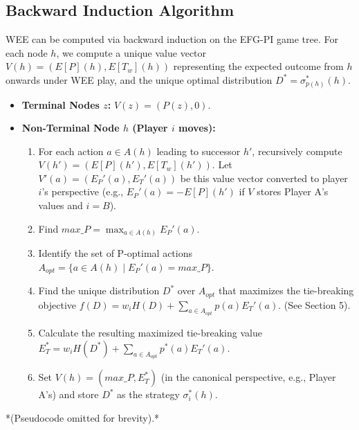 \documentclass{article}
\begin{document}
\subsection{Backward Induction Algorithm}
WEE can be computed via backward induction on the EFG-PI game tree. For each node $h$, we compute a unique value vector $V(h) = (E[P](h), E[T_w](h))$ representing the expected outcome from $h$ onwards under WEE play, and the unique optimal distribution $D^* = \sigma_{p(h)}^*(h)$.
\begin{itemize}
    \item \textbf{Terminal Nodes $z$:} $V(z) = (P(z), 0)$.
    \item \textbf{Non-Terminal Node $h$ (Player $i$ moves):}
        \begin{enumerate}
            \item For each action $a \in A(h)$ leading to successor $h'$, recursively compute $V(h') = (E[P](h'), E[T_w](h'))$. Let $V'(a) = (E_P'(a), E_T'(a))$ be this value vector converted to player $i$'s perspective (e.g., $E_P'(a) = -E[P](h')$ if $V$ stores Player A's values and $i=B$).
            \item Find $max\_P = \max_{a \in A(h)} E_P'(a)$.
            \item Identify the set of P-optimal actions $A_{opt} = \{a \in A(h) \mid E_P'(a) = max\_P\}$.
            \item Find the unique distribution $D^*$ over $A_{opt}$ that maximizes the tie-breaking objective $f(D) = w_i H(D) + \sum_{a \in A_{opt}} p(a) E_T'(a)$. (See Section 5).
            \item Calculate the resulting maximized tie-breaking value $E_T^* = w_i H(D^*) + \sum_{a \in A_{opt}} p^*(a) E_T'(a)$.
            \item Set $V(h) = (max\_P, E_T^*)$ (in the canonical perspective, e.g., Player A's) and store $D^*$ as the strategy $\sigma_i^*(h)$.
        \end{enumerate}
\end{itemize}
*(Pseudocode omitted for brevity).*
\end{document}
